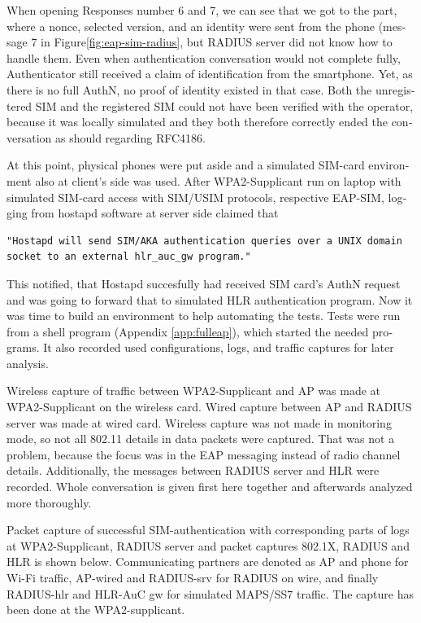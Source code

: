 \documentclass[12pt,a4paper,english]{tutthesis}
\begin{document}
\begin{otherlanguage}{english}
When opening Responses number 6 and 7, we can see that we got to the
part, where a nonce, selected version, and an identity were sent from
the phone (message 7 in Figure\ref{fig:eap-sim-radius}, but RADIUS server
did not know how to handle them.
 Even when authentication conversation would not complete fully,
Authenticator still received a claim of identification from the
smartphone. Yet, as there is no full AuthN, no proof of identity existed in
that case.
Both the unregistered SIM and the registered SIM could not have been
verified with the
operator, because it was locally simulated and they both therefore
correctly  ended the conversation as should regarding
RFC4186\cite{rfc4186}.

At this point, physical phones were put aside and a simulated SIM-card
environment also at client's  side was used.
After WPA2-Supplicant run on laptop with simulated SIM-card access 
with SIM/USIM protocols, respective EAP-SIM, logging 
from hostapd software at server side  claimed that 
\begin{verbatim}
"Hostapd will send SIM/AKA authentication queries over a UNIX domain socket to an external hlr_auc_gw program."
\end{verbatim}
This notified, that Hostapd succesfully had received SIM
card's AuthN request and was going to forward that to simulated HLR
authentication program. Now it was time to build an
environment to help automating the tests.
Tests were run from a shell program (Appendix \ref{app:fulleap}), which
started the needed programs. It also recorded used configurations, logs,
and traffic captures for later analysis.



Wireless capture of traffic between WPA2-Supplicant and AP was made at
WPA2-Supplicant on the wireless card. Wired capture between AP and
RADIUS server was made at wired card. Wireless capture was
not made in monitoring mode, so not all 802.11 details in
data packets were captured\cite{wireshark-capture}.
That was not a problem, because the focus was 
in the EAP messaging instead of radio channel details.
Additionally, the messages between RADIUS server and HLR were recorded.
Whole conversation is given first here together and afterwards analyzed more
thoroughly.



Packet capture of successful SIM-authentication with corresponding
parts of logs at WPA2-Supplicant, RADIUS server and packet captures
802.1X, RADIUS and HLR is shown below.  Communicating partners are
denoted as AP and phone for Wi-Fi traffic, AP-wired and
RADIUS-srv for RADIUS on wire, and finally RADIUS-hlr and HLR-AuC gw
for simulated MAPS/SS7 traffic.
The capture has been done at the WPA2-supplicant.


\end{otherlanguage}
\end{document}
